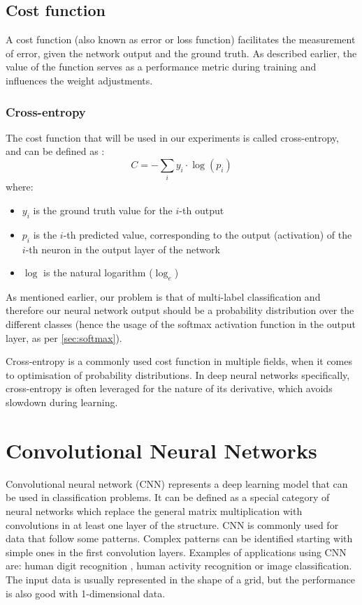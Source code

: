 \subsection{Cost function}
A cost function (also known as error or loss function) facilitates the measurement of error, given the network output and the ground truth. As described earlier, the value of the function serves as a performance metric during training and influences the weight adjustments.
\medskip
\par
\subsubsection{Cross-entropy}
The cost function that will be used in our experiments is called cross-entropy, and can be defined as \cite{nielsenneural}:
\begin{equation*}
    C = - \sum_i y_i \cdot \log(p_i)
\end{equation*}
where:
\begin{itemize}
    \item $y_i$ is the ground truth value for the $i$-th output
    \item $p_i$ is the $i$-th predicted value, corresponding to the output (activation) of the $i$-th neuron in the output layer of the network
    \item $\log$ is the natural logarithm ($\log_e$)
\end{itemize}
\medskip
\par
As mentioned earlier, our problem is that of multi-label classification and therefore our neural network output should be a probability distribution over the different classes (hence the usage of the softmax activation function in the output layer, as per \cref{sec:softmax}).
\medskip
\par
Cross-entropy is a commonly used cost function in multiple fields, when it comes to optimisation of probability distributions. In deep neural networks specifically, cross-entropy is often leveraged for the nature of its derivative, which avoids slowdown during learning.






\pagebreak
\section{Convolutional Neural Networks}

\par
Convolutional neural network (CNN) represents a deep learning model that can be used in classification problems. It can be defined as a special category of neural networks which replace the general matrix multiplication with convolutions in at least one layer of the structure.\cite{Goodfellow}
CNN is commonly used for data that follow some patterns. Complex patterns can be identified starting with simple ones in the first convolution layers. Examples of applications using CNN are: human digit recognition \cite{digits}, human activity recognition \cite{convolutional} or image classification. The input data is usually represented in the shape of a grid, but the performance is also good with 1-dimensional data.


